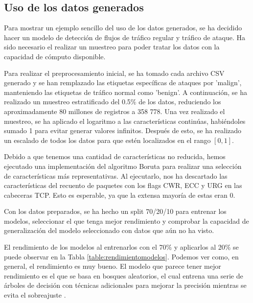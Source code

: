 \documentclass[10pt,a4paper,twoside]{article}
\begin{document}
\begin{multicols*}{2}
    \section{Uso de los datos generados} \label{casoml}

    Para mostrar un ejemplo sencillo del uso de los datos generados, se ha decidido hacer un modelo de detección de flujos de tráfico regular y tráfico de ataque. Ha sido necesario el realizar un muestreo para poder tratar los datos con la capacidad de cómputo disponible. 

    Para realizar el preprocesamiento inicial, se ha tomado cada archivo CSV generado y se han remplazado las etiquetas específicas de ataques por 'malign', manteniendo las etiquetas de tráfico normal como 'benign'. A continuación, se ha realizado un muestreo estratificado del 0.5\% de los datos, reduciendo los aproximadamente 80 millones de registros a 358 778. Una vez realizado el muestreo, se ha aplicado el logaritmo a las características continúas, habiéndoles sumado 1 para evitar generar valores infinitos. Después de esto, se ha realizado un escalado de todos los datos para que estén localizados en el rango $[0, 1]$. 
    
    Debido a que tenemos una cantidad de características no reducida, hemos ejecutado una implementación del algoritmo Boruta \cite{borutapy} para realizar una selección de características más representativas. Al ejecutarlo, nos ha descartado las características del recuento de paquetes con los flags CWR, ECC y URG en las cabeceras TCP. Esto es esperable, ya que la extensa mayoría de estas eran 0.

    Con los datos preparados, se ha hecho un split 70/20/10 para entrenar los modelos, seleccionar el que tenga mejor rendimiento y comprobar la capacidad de generalización del modelo seleccionado con datos que aún no ha visto. 

    El rendimiento de los modelos al entrenarlos con el 70\% y aplicarlos al 20\% se puede observar en la Tabla \ref{table:rendimientomodelos}. Podemos ver como, en general, el rendimiento es muy bueno. El modelo que parece tener mejor rendimiento es el que se basa en bosques aleatorios, el cual entrena una serie de árboles de decisión con técnicas adicionales para mejorar la precisión mientras se evita el sobreajuste \cite{sklearnrandomforest}.


\end{multicols*}
\end{document}
